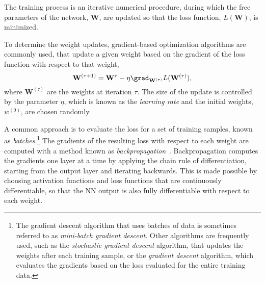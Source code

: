 The training process is an iterative numerical procedure, during which the free parameters of the network, $\mathbf{W}$, are updated so that the loss function, $L(\mathbf{W})$, is minimized.

To determine the weight updates, gradient-based optimization algorithms are commonly used, that update a given weight based on the gradient of the loss function with respect to that weight, 
\begin{equation}
    \label{eq:gradient-descent}
    \mathbf{W}^{(\tau+1)} = \mathbf{W}^\tau - \eta \grad_{\mathbf{W}^{(\tau)}} L(\mathbf{W}^{(\tau)}),
\end{equation}
where $\mathbf{W}^{(\tau)}$ are the weights at iteration $\tau$.
The size of the update is controlled by the parameter $\eta$, which is known as the \emph{learning rate} and the initial weights, $w^{(0)}$, are chosen randomly.

A common approach is to evaluate the loss for a set of training samples, known as \emph{batches}.\footnote{The gradient descent algorithm that uses batches of data is sometimes referred to as \emph{mini-batch gradient descent}. Other algorithms are frequently used, such as the \emph{stochastic gradient descent} algorithm, that updates the weights after each training sample, or the \emph{gradient descent} algorithm, which evaluates the gradients based on the loss evaluated for the entire training data.} 
The gradients of the resulting loss with respect to each weight are computed with a method known as \emph{backpropagation}~. Backpropagation computes the gradients one layer at a time by applying the chain rule of differentiation, starting from the output layer and iterating backwards.
This is made possible by choosing activation functions and loss functions that are continuously differentiable, so that the NN output is also fully differentiable with respect to each weight.


